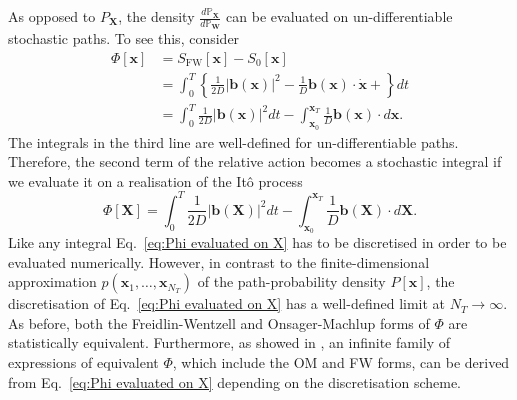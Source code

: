As opposed to $P_\mathbf{X}$, the density $\frac{d \mathbb{P}_\mathbf{X}}{d \mathbb{P}_\mathbf{W}}$ can be evaluated on un-differentiable stochastic paths. To see this, consider
\begin{equation} \label{eq:Phi relative action}
\begin{aligned}
\Phi[\mathbf{x}] & = S_\text{FW}[\mathbf{x}] - S_0[\mathbf{x}] \\
& = \int_0^T \left\{ \frac{1}{2D} |\mathbf{b}(\mathbf{x})|^2 - \frac{1}{D} \mathbf{b}(\mathbf{x}) \cdot \dot{\mathbf{x}} +  \right\} dt \\
& = \int_0^T  \frac{1}{2D} |\mathbf{b}(\mathbf{x})|^2 dt - \int_{\mathbf{x}_0}^{\mathbf{x}_T} \frac{1}{D} \mathbf{b}(\mathbf{x}) \cdot d \mathbf{x}.
\end{aligned}
\end{equation}
The integrals in the third line are well-defined for un-differentiable paths. Therefore, the second term of the relative action becomes a stochastic integral if we evaluate it on a realisation of the It\^{o} process
\begin{equation} \label{eq:Phi evaluated on X}
\Phi[\mathbf{X}] = \int_0^T  \frac{1}{2D} |\mathbf{b}(\mathbf{X})|^2 dt - \int_{\mathbf{x}_0}^{\mathbf{x}_T} \frac{1}{D} \mathbf{b}(\mathbf{X}) \cdot d \mathbf{X}.
\end{equation}
Like any integral Eq.~\ref{eq:Phi evaluated on X} has to be discretised in order to be evaluated numerically. However, in contrast to the finite-dimensional approximation $p(\mathbf{x}_1, \dots, \mathbf{x}_{N_T})$ of the path-probability density $P[\mathbf{x}]$, the discretisation of Eq.~\ref{eq:Phi evaluated on X} has a well-defined limit at $N_T \to \infty$. As before, both the Freidlin-Wentzell and Onsager-Machlup forms of $\Phi$ are statistically equivalent. Furthermore, as showed in \citep{gladrowExperimentalMeasurementRelative2021a}, an infinite family of expressions of equivalent $\Phi$, which include the OM and FW forms, can be derived from Eq.~\ref{eq:Phi evaluated on X} depending on the discretisation scheme.

